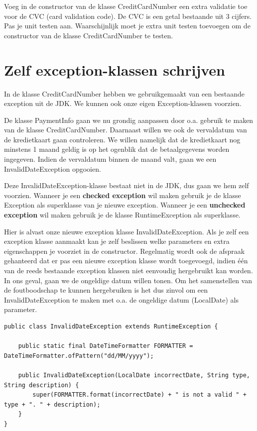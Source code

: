 \begin{oefening}
Voeg in de constructor van de klasse CreditCardNumber een extra validatie toe voor de CVC (card validation code). De CVC is een getal bestaande uit 3 cijfers.
Pas je unit testen aan. Waarschijnlijk moet je extra unit testen toevoegen om de constructor van de klasse CreditCardNumber te testen.
\end{oefening}


\section{Zelf exception-klassen schrijven}

In de klasse CreditCardNumber hebben we gebruikgemaakt van een bestaande exception uit de JDK. We kunnen ook onze eigen Exception-klassen voorzien.

De klasse PaymentInfo gaan we nu grondig aanpassen door o.a. gebruik te maken van de klasse CreditCardNumber. Daarnaast willen we ook de vervaldatum van de kredietkaart gaan controleren. We willen namelijk dat de kredietkaart nog minstens 1 maand geldig is op het ogenblik dat de betaalgegevens worden ingegeven. Indien de vervaldatum binnen de maand valt, gaan we een InvalidDateException opgooien.

Deze InvalidDateException-klasse bestaat niet in de JDK, dus gaan we hem zelf voorzien. Wanneer je een \textbf{checked exception} wil maken gebruik je de klasse Exception als superklasse van je nieuwe exception. Wanneer je een \textbf{unchecked exception} wil maken gebruik je de klasse RuntimeException als superklasse.

Hier is alvast onze nieuwe exception klasse InvalidDateException. Als je zelf een exception klasse aanmaakt kan je zelf beslissen welke parameters en extra eigenschappen je voorziet in de constructor. Regelmatig wordt ook de afspraak gehanteerd dat er pas een nieuwe exception klasse wordt toegevoegd, indien \'e\'en van de reeds bestaande exception klassen niet eenvoudig hergebruikt kan worden. In ons geval, gaan we de ongeldige datum willen tonen. Om het samenstellen van de foutboodschap te kunnen hergebruiken is het dus zinvol om een InvalidDateException te maken met o.a. de ongeldige datum (LocalDate) als parameter.

\begin{lstlisting}
public class InvalidDateException extends RuntimeException {

	public static final DateTimeFormatter FORMATTER = DateTimeFormatter.ofPattern("dd/MM/yyyy");

	public InvalidDateException(LocalDate incorrectDate, String type, String description) {
		super(FORMATTER.format(incorrectDate) + " is not a valid " + type + ". " + description);
	}
}
\end{lstlisting}

